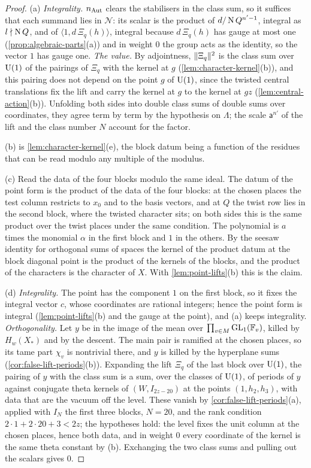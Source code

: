 \begin{proof}
(a) \emph{Integrality.} $n_{\rm Aut}$ clears the stabilisers in the class sum, so it suffices that each summand lies in $\mathcal N$: its scalar is the product of $d/\operatorname{N} Q^{n'-1}$, integral as $l\nmid\operatorname{N} Q$, and of $\langle1,d\,\Xi_q(h)\rangle$, integral because
$d\,\Xi_q(h)$ has gauge at most one (\cref{prop:algebraic-parts}(a)) and in weight $0$ the group acts as the identity, so the vector $1$ has gauge one. \emph{The value.} By adjointness, $\lVert \Xi_q\rVert^2$ is the class sum over $\operatorname{U}(1)$ of the
pairings of $\Xi_q$ with the kernel at $g$ (\cref{lem:character-kernel}(b)), and this pairing does not depend on the point $g$ of $\operatorname{U}(1)$, since the twisted central translations fix the lift and carry the kernel at $g$ to the
kernel at $gz$ (\cref{lem:central-action}(b)). Unfolding both sides into double class sums of double sums over coordinates, they agree term by term by the hypothesis on $\Lambda$; the scale $\mathsf a^{n'}$ of the lift and the
class number $N$ account for the factor.

(b) is \cref{lem:character-kernel}(e), the block datum being a function of the residues that can be read modulo any multiple of the modulus.

(c) Read the data of the four blocks modulo the same ideal. The datum of the point form is the product of the data of the four blocks: at the chosen places the test column restricts to $x_0$ and to the basis vectors, and
at $Q$ the twist row lies in the second block, where the twisted character sits; on both sides this is the same product over the twist places under the same condition. The polynomial is $a$ times the monomial $\alpha$
in the first block and $1$ in the others. By the seesaw identity for orthogonal sums of spaces the kernel of the product datum at the block diagonal point is the product of the kernels of the blocks, and the product
of the characters is the character of $X$. With \cref{lem:point-lifts}(b) this is the claim.

(d) \emph{Integrality.} The point has the component $1$ on the first block, so it fixes the integral vector $c$, whose coordinates are rational integers; hence the point form is integral (\cref{lem:point-lifts}(b) and the gauge at the point), and (a)
keeps integrality. \emph{Orthogonality.} Let $y$ be in the image of the mean over $\prod_{v\in M}\operatorname{GL}_1(\mathbb{F}_v)$, killed by $H_w(X_*)$ and by the descent. The main pair is ramified at the chosen places, so its tame part
$\chi_v$ is nontrivial there, and $y$ is killed by the hyperplane sums (\cref{cor:false-lift-periods}(b)). Expanding the lift $\Xi_q$ of the last block over $\operatorname{U}(1)$, the pairing of $y$ with the class sum is a sum, over the
classes of $\operatorname{U}(1)$, of periods of $y$ against conjugate theta kernels of $(W,I_{2z-20})$ at the points $(1,h_2,h_3)$, with data that are the vacuum off the level. These vanish by \cref{cor:false-lift-periods}(a), applied with
$I_N$ the first three blocks, $N=20$, and the rank condition $2\cdot1+2\cdot20+3<2z$; the hypotheses hold: the level fixes the unit column at the chosen places, hence both data, and in weight $0$ every coordinate of the
kernel is the same theta constant by (b). Exchanging the two class sums and pulling out the scalars gives $0$.


\end{proof}
